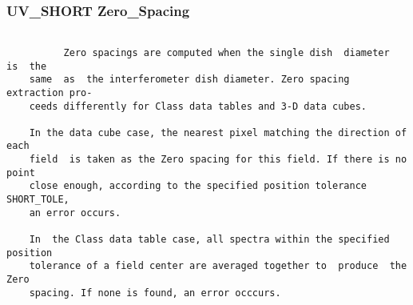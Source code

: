 \subsubsection{UV\_SHORT Zero\_Spacing}
\begin{verbatim}

          Zero spacings are computed when the single dish  diameter  is  the
    same  as  the interferometer dish diameter. Zero spacing extraction pro-
    ceeds differently for Class data tables and 3-D data cubes.

    In the data cube case, the nearest pixel matching the direction of  each
    field  is taken as the Zero spacing for this field. If there is no point
    close enough, according to the specified position tolerance  SHORT_TOLE,
    an error occurs.

    In  the Class data table case, all spectra within the specified position
    tolerance of a field center are averaged together to  produce  the  Zero
    spacing. If none is found, an error occcurs.


\end{verbatim}

